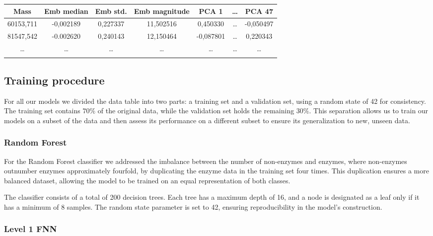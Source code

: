 \documentclass{bioinfo}
\begin{document}
\begin{methods}
\begin{table}[!htbp]
\setlength{\tabcolsep}{2pt}
 {
	\begin{tabular}{@{}ccccccc@{}}
		\toprule 
		Mass & Emb median & Emb std. & Emb magnitude & PCA 1 & \dots & PCA 47\\
		\midrule
		60153,711 & -0,002189 & 0,227337 & 11,502516 & 0,450330 & \dots & -0,050497\\
		81547,542 & -0.002620 & 0,240143 & 12,150464 & -0,087801 & \dots & 0,220343 \\
		\dots & \dots & \dots & \dots & \dots & \dots & \dots \\
		\botrule
    \end{tabular}
}{}
\end{table}

\subsection{Training procedure}
For all our models we divided the data table into two parts: a training set and a validation set, using a random state of 42 for consistency. 
The training set contains $70\%$ of the original data, while the validation set holds the remaining $30\%$. 
This separation allows us to train our models on a subset of the data and then assess its performance on a different subset to ensure its generalization to new, unseen data.

\subsubsection{Random Forest}

For the Random Forest classifier we addressed the imbalance between the number of non-enzymes and enzymes, where non-enzymes outnumber enzymes approximately fourfold,
by duplicating the enzyme data in the training set four times.
This duplication ensures a more balanced dataset, allowing the model to be trained on an equal representation of both classes.

The classifier consists of a total of 200 decision trees.
Each tree has a maximum depth of 16, and a node is designated as a leaf only if it has a minimum of 8 samples.
The random state parameter is set to 42, ensuring reproducibility in the model's construction.
\subsubsection{Level 1 FNN}

\end{methods}
\end{document}
